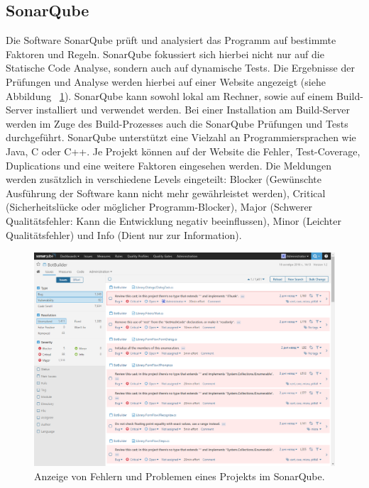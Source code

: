 \subsection{SonarQube}
Die Software SonarQube prüft und analysiert das Programm auf bestimmte Faktoren und Regeln. SonarQube fokussiert sich hierbei nicht nur auf die Statische Code Analyse, sondern auch auf dynamische Tests. Die Ergebnisse der Prüfungen und Analyse werden hierbei auf einer Website angezeigt (siehe Abbildung ~\ref{fig:sonarQube}). SonarQube kann sowohl lokal am Rechner, sowie auf einem Build-Server installiert und verwendet werden. Bei einer Installation am Build-Server werden im Zuge des Build-Prozesses auch die SonarQube Prüfungen und Tests durchgeführt. SonarQube unterstützt eine Vielzahl an Programmiersprachen wie Java, C oder C++. Je Projekt können auf der Website die Fehler, Test-Coverage, Duplications und eine weitere Faktoren eingesehen werden. Die Meldungen werden zusätzlich in verschiedene Levels eingeteilt: Blocker (Gewünschte Ausführung der Software kann nicht mehr gewährleistet werden), Critical (Sicherheitslücke oder möglicher Programm-Blocker), Major (Schwerer Qualitätsfehler: Kann die Entwicklung negativ beeinflussen), Minor (Leichter Qualitätsfehler) und Info (Dient nur zur Information). \parencite{sonarQubeHeise}

\begin{figure}[tp]
  \centering
  \includegraphics[height=8cm]{images/sonarQube.PNG}
 \caption[Anzeige von Fehlern und Problemen eines Projekts im SonarQube]{Anzeige von Fehlern und Problemen eines Projekts im SonarQube.}
  \label{fig:sonarQube}
\end{figure}

